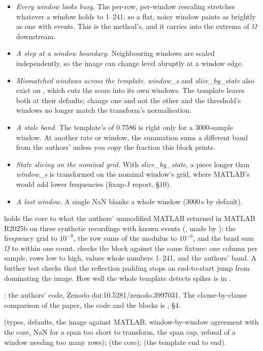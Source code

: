 \begin{itemize}
\item \emph{Every window looks busy.} The per-row, per-window rescaling stretches whatever a
  window holds to 1--241, so a flat, noisy window paints as brightly as one with events.
  This is the method's, and it carries into the extrema of $\Omega$ downstream.
\item \emph{A step at a window boundary.} Neighbouring windows are scaled independently, so
  the image can change level abruptly at a window edge.
\item \emph{Mismatched windows across the template.} \emph{window\_s} and
  \emph{slice\_by\_state} also exist on , which cuts the
  score into its own windows. The template leaves both at their defaults; change one and not
  the other and the threshold's windows no longer match the transform's normalisation.
\item \emph{A stale band.} The template's  of 0.7586 is right only for a
  3000-sample window. At another rate or window, the summation sums a different band from the
  authors' unless you copy the fraction this block prints.
\item \emph{State slicing on the nominal grid.} With \emph{slice\_by\_state}, a piece longer
  than \emph{window\_s} is transformed on the nominal window's grid, where MATLAB's
   would add lower frequencies (fixup-J report, \S10).
\item \emph{A lost window.} A single NaN blanks a whole window (3000\,s by default).
\end{itemize}

 holds the core to what the authors' unmodified MATLAB
returned in MATLAB R2025b on three synthetic recordings with known events
(, made by ):
the frequency grid to $10^{-9}$, the row sums of the modulus to $10^{-6}$, and the band sum
$\Omega$ to within one count.  checks the block
against the same fixture: one column per sample, rows low to high, values whole numbers
1--241, and the authors' band. A further test checks that the reflection padding stops an
end-to-start jump from dominating the image. How well the whole template detects spikes is in
.

\citet{dehshibi2021electrical}; the authors' code, Zenodo doi:10.5281/zenodo.3997031. The
clause-by-clause comparison of the paper, the code and the blocks is
, \S4.

 (types, defaults, the image against MATLAB,
window-by-window agreement with the core, NaN for a span too short to transform, the span cap,
refusal of a window needing too many rows);  (the core);
 (the template end to end).
